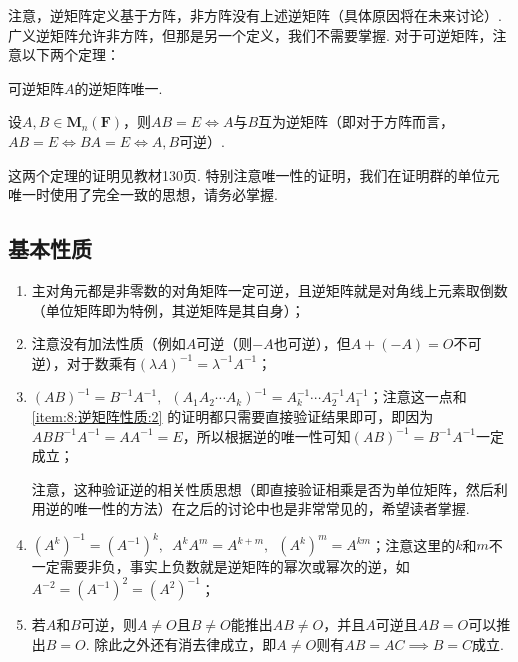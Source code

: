 注意，逆矩阵定义基于方阵，非方阵没有上述逆矩阵（具体原因将在未来讨论）. 广义逆矩阵允许非方阵，但那是另一个定义，我们不需要掌握. 对于可逆矩阵，注意以下两个定理：
\begin{theorem}{}{}
    可逆矩阵$A$的逆矩阵唯一.
\end{theorem}

\begin{theorem}{}{}
    设$A,B\in \mathbf{M}_n(\mathbf{F})$，则$AB=E \iff A$与$B$互为逆矩阵（即对于方阵而言，$AB=E\iff BA=E\iff A,B$可逆）.
\end{theorem}
这两个定理的证明见教材130页. 特别注意唯一性的证明，我们在证明群的单位元唯一时使用了完全一致的思想，请务必掌握.

\subsection{基本性质}

\begin{enumerate}[label=(\arabic*)]
    \item 主对角元都是非零数的对角矩阵一定可逆，且逆矩阵就是对角线上元素取倒数（单位矩阵即为特例，其逆矩阵是其自身）；

    \item \label{item:8:逆矩阵性质:2}
          注意没有加法性质（例如$A$可逆（则$-A$也可逆），但$A+(-A)=O$不可逆），对于数乘有$(\lambda A)^{-1}=\lambda^{-1}A^{-1}$；

    \item \label{item:8:逆矩阵性质:3}
          $(AB)^{-1}=B^{-1}A^{-1},\enspace (A_1A_2\cdots A_k)^{-1}=A_k^{-1}\cdots A_2^{-1}A_1^{-1}$；注意这一点和 \ref*{item:8:逆矩阵性质:2} 的证明都只需要直接验证结果即可，即因为$ABB^{-1}A^{-1}=AA^{-1}=E$，所以根据逆的唯一性可知$(AB)^{-1}=B^{-1}A^{-1}$一定成立；

          注意，这种验证逆的相关性质思想（即直接验证相乘是否为单位矩阵，然后利用逆的唯一性的方法）在之后的讨论中也是非常常见的，希望读者掌握.

    \item $(A^k)^{-1}=(A^{-1})^k,\enspace A^kA^m=A^{k+m},\enspace (A^k)^m=A^{km}$；注意这里的$k$和$m$不一定需要非负，事实上负数就是逆矩阵的幂次或幂次的逆，如$A^{-2}=(A^{-1})^2=(A^2)^{-1}$；

    \item 若$A$和$B$可逆，则$A\neq O$且$B\neq O$能推出$AB\neq O$，并且$A$可逆且$AB=O$可以推出$B=O$. 除此之外还有消去律成立，即$A \neq O$则有$AB=AC \implies B=C$成立.
\end{enumerate}

